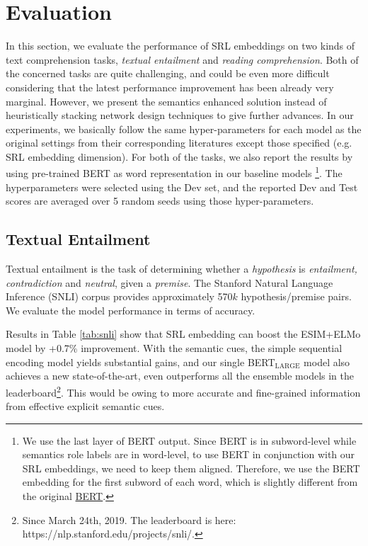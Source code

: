 \documentclass[11pt]{article}
\begin{document}
\section{Evaluation}
In this section, we evaluate the performance of SRL embeddings on two kinds of text comprehension tasks, \emph{textual entailment} and \emph{reading comprehension}. Both of the concerned tasks are quite challenging, and could be even more difficult considering that the latest performance improvement has been already very marginal. However, we present the semantics enhanced solution instead of heuristically stacking network design techniques to give further advances. In our experiments, we basically follow the same hyper-parameters for each model as the original settings from their corresponding literatures \citep{Peters2018ELMO,Chen2017Enhanced,clark2018simple} except those specified (e.g. SRL embedding dimension). For both of the tasks, we also report the results by using pre-trained BERT \citep{devlin2018bert} as word representation in our baseline models \footnote{We use the last layer of BERT output. Since BERT is in subword-level while semantics role labels are in word-level, to use BERT in conjunction with our SRL embeddings, we need to keep them aligned. Therefore, we use the BERT embedding for the first subword of each word, which is slightly different from the original \href{https://github.com/google-research/bert}{BERT}. }. The hyperparameters were selected using the Dev set, and the reported Dev and Test scores are averaged over 5 random seeds using those hyper-parameters.


\subsection{Textual Entailment} 

Textual entailment is the task of determining whether a \emph{hypothesis} is \emph{entailment, contradiction} and \emph{neutral}, given a \emph{premise}. The Stanford Natural Language Inference (SNLI) corpus \citep{Bowman2015A} provides approximately 570$k$ hypothesis/premise pairs. We evaluate the model performance in terms of accuracy.

Results in Table \ref{tab:snli} show that SRL embedding can boost the ESIM+ELMo model by +0.7\% improvement. With the semantic cues, the simple sequential encoding model yields substantial gains, and our single BERT$_\text{LARGE}$ model also achieves a new state-of-the-art, even outperforms all the ensemble models in the leaderboard\footnote{Since March 24th, 2019. The leaderboard is here: https://nlp.stanford.edu/projects/snli/. }. This would be owing to more accurate and fine-grained information from effective explicit semantic cues.
\end{document}
